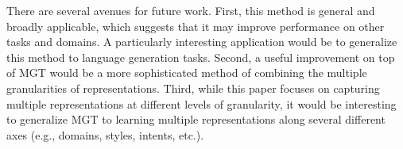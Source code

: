 \documentclass[11pt,a4paper]{article}
\begin{document}
There are several avenues for future work. First, this method is general and broadly applicable, which suggests that it may improve performance on other tasks and domains. A particularly interesting application would be to generalize this method to language generation tasks. Second, a useful improvement on top of MGT would be a more sophisticated method of combining the multiple granularities of representations.  Third, while this paper focuses on capturing multiple representations at different levels of granularity, it would be interesting to generalize MGT to learning multiple representations along several different axes (e.g., domains, styles, intents, etc.). 




\end{document}
